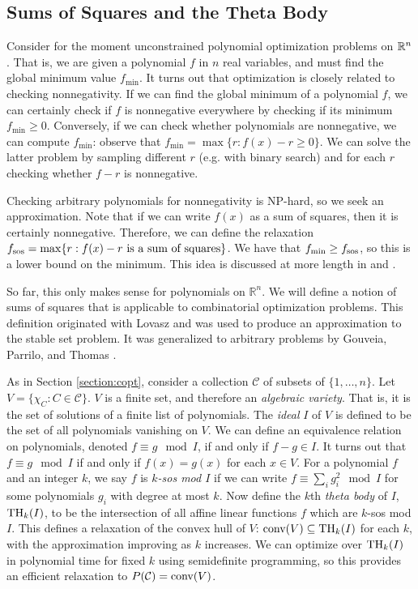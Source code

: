 \subsection{Sums of Squares and the Theta Body}
Consider for the moment unconstrained polynomial optimization problems on $\mathbb{R}^n$. 
That  is, we are given a polynomial $f$ in $n$ real variables, and must find the global minimum value $f_{\min}$. 
It turns out that optimization is closely related to checking nonnegativity.
If we can find the global minimum of a polynomial $f$, we can certainly check if $f$ is nonnegative everywhere by checking if its minimum $f_{\min} \ge 0$.
Conversely, if we can check whether polynomials are nonnegative, we can compute $f_{\min}$: observe that $f_{\min} = \max \{r: f(x) - r \ge 0\}$. 
We can solve the latter problem by sampling different $r$ (e.g. with binary search) and for each $r$ checking whether $f - r$ is nonnegative.

Checking arbitrary polynomials for nonnegativity is NP-hard, so we seek an approximation.
Note that if we can write $f(x)$ as a sum of squares, then it is certainly nonnegative. 
Therefore, we can define the relaxation $f_{\textup{sos}} = \max \{r: f(x) - r \textup{ is a sum of squares}\}$.
We have that $f_{\min} \ge f_{\textup{sos}}$, so this is a lower bound on the minimum. 
This idea is discussed at more length in \cite{sostools} and \cite{lasserre}. 

So far, this only makes sense for polynomials on $\mathbb{R}^n$.
We will define a notion of sums of squares that is applicable to combinatorial optimization problems.
This definition originated with Lovasz \cite{lovasz} and was used to produce an approximation to the stable set problem.
It was generalized to arbitrary problems by Gouveia, Parrilo, and Thomas \cite{gpt}.

As in Section \ref{section:copt}, consider a collection $\mathcal{C}$ of subsets of $\{1, \ldots, n\}$. 
Let $V = \{\chi_C: C \in \mathcal{C}\}$.
$V$ is a finite set, and therefore an {\em algebraic variety}.
That is, it is the set of solutions of a finite list of polynomials.
The {\em ideal} $I$ of $V$ is defined to be the set of all polynomials vanishing on $V$.
We can define an equivalence relation on polynomials, denoted $f \equiv g \mod I$, if and only if $f - g \in I$.
It turns out that $f \equiv g \mod I$ if and only if $f(x) = g(x)$ for each $x \in V$.
For a polynomial $f$ and an integer $k$, we say $f$ is {\em $k$-sos mod $I$} if we can write $f \equiv \sum_i g_i^2 \mod I$ for some polynomials $g_i$ with degree at most $k$.
Now define the $k$th {\em theta body} of $I$, $\textup{TH}_k(I)$, to be the intersection of all affine linear functions $f$ which are $k$-sos mod $I$. 
This defines a relaxation of the convex hull of $V$: $\hbox{conv}(V) \subseteq \textup{TH}_k(I)$ for each $k$, with the approximation improving as $k$ increases.
We can optimize over $\textup{TH}_k(I)$ in polynomial time for fixed $k$ using semidefinite programming, so this provides an efficient relaxation to $P(\mathcal{C}) = \hbox{conv}(V)$.

